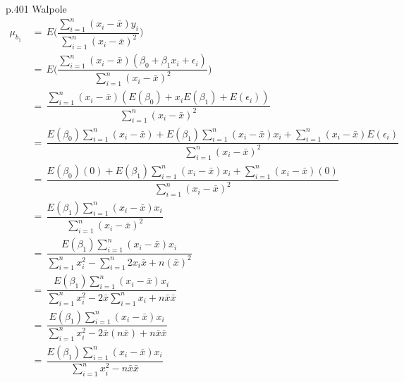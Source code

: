 \newpage
p.401 Walpole \\[2ex]
\begin{align*}
    \mu_{b_{1}} \hspace{2pt} &= \hspace{2pt} E\Big(\dfrac{\sum_{i = 1}^{n} (x_{i} - \bar{x})y_{i}}{\sum_{i = 1}^{n} (x_{i} - \bar{x})^{2}} \Big) \\[1ex]
    &= \hspace{2pt} E\Big(\dfrac{\sum_{i = 1}^{n} (x_{i} - \bar{x})(\beta_{0} + \beta_{1}x_{i} + \epsilon_{i})}{\sum_{i = 1}^{n} (x_{i} - \bar{x})^{2}} \Big) \\[1ex]
    &= \hspace{2pt} \dfrac{\sum_{i = 1}^{n} (x_{i} - \bar{x})(E(\beta_{0}) + x_{i}E(\beta_{1}) + E(\epsilon_{i}))}{\sum_{i = 1}^{n} (x_{i} - \bar{x})^{2}} \\[1ex]
    &= \hspace{2pt} \dfrac{E(\beta_{0})\sum_{i = 1}^{n} (x_{i} - \bar{x}) + E(\beta_{1})\sum_{i = 1}^{n} (x_{i} - \bar{x})x_{i} + \sum_{i = 1}^{n} (x_{i} - \bar{x})E(\epsilon_{i})}{\sum_{i = 1}^{n} (x_{i} - \bar{x})^{2}} \\[1ex]
    &= \hspace{2pt} \dfrac{E(\beta_{0})(0) + E(\beta_{1})\sum_{i = 1}^{n} (x_{i} - \bar{x})x_{i} + \sum_{i = 1}^{n} (x_{i} - \bar{x})(0)}{\sum_{i = 1}^{n} (x_{i} - \bar{x})^{2}} \\[1ex]
    &= \hspace{2pt} \dfrac{E(\beta_{1})\sum_{i = 1}^{n} (x_{i} - \bar{x})x_{i}}{\sum_{i = 1}^{n} (x_{i} - \bar{x})^{2}} \\[1ex]
    &= \hspace{2pt} \dfrac{E(\beta_{1})\sum_{i = 1}^{n} (x_{i} - \bar{x})x_{i}}{\sum_{i = 1}^{n} x_{i}^{2} - \sum_{i = 1}^{n} 2x_{i}\bar{x} + n(\bar{x})^{2}} \\[1ex]
    &= \hspace{2pt} \dfrac{E(\beta_{1})\sum_{i = 1}^{n} (x_{i} - \bar{x})x_{i}}{\sum_{i = 1}^{n} x_{i}^{2} - 2\bar{x}\sum_{i = 1}^{n} x_{i} + n\bar{x}\bar{x}} \\[1ex]
    &= \hspace{2pt} \dfrac{E(\beta_{1})\sum_{i = 1}^{n} (x_{i} - \bar{x})x_{i}}{\sum_{i = 1}^{n} x_{i}^{2} - 2\bar{x}(n\bar{x}) + n\bar{x}\bar{x}} \\[1ex]
    &= \hspace{2pt} \dfrac{E(\beta_{1})\sum_{i = 1}^{n} (x_{i} - \bar{x})x_{i}}{\sum_{i = 1}^{n} x_{i}^{2} - n\bar{x}\bar{x}} \\[1ex]

\end{align*}
